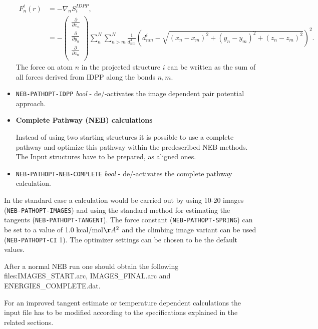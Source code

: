 \documentclass[10pt,a4paper]{article} %
\begin{document}
\begin{itemize}
	\begin{equation}
	\begin{aligned}
	F^{i}_{n}(r) &=-\nabla_{n}S^{IDPP}_{i}, \\
	&= -\left(\begin{matrix}
	\frac{\partial}{\partial x_{n}} \\
	\frac{\partial}{\partial y_{n}} \\
	\frac{\partial}{\partial z_{n}}  \\
	\end{matrix} \right) \sum^{N}_{n}\sum^{N}_{n>m} \frac{1}{d^{4}_{nm}} \left(d^{i}_{nm}-\sqrt{\left(x_{n}-x_{m}\right)^{2}+\left(y_{n}-y_{m}\right)^{2}+\left(z_{n}-z_{m}\right)^{2}}\right)^{2}.
	\end{aligned}											
	\end{equation}
	The force on atom $n$ in the projected structure $i$ can be written as the sum of all forces derived from IDPP along the bonds $n,m$. 
	
	\item \texttt{NEB-PATHOPT-IDPP} \textit{bool} -  de/-activates the image dependent pair potential approach.
	
	\item \textbf{Complete Pathway (NEB) calculations}
	
	Instead of using two starting structures it is possible to use a complete pathway and optimize this pathway within the predescribed NEB methods.
	The Input structures have to be prepared, as aligned ones.
	
	\item \texttt{NEB-PATHOPT-NEB-COMPLETE} \textit{bool} -  de/-activates the complete pathway calculation.
    \end{itemize}

In the standard case a calculation would be carried out by using 10-20 images (\texttt{NEB-PATHOPT-IMAGES}) and using the standard method for estimating the tangents (\texttt{NEB-PATHOPT-TANGENT}). The force constant (\texttt{NEB-PATHOPT-SPRING}) can be set to a value of 1.0 kcal/mol$\AA^{2}$  and the climbing image variant can be used (\texttt{NEB-PATHOPT-CI} 1). The optimizer settings can be chosen to be the default values.

After a normal NEB run one should obtain the following files:IMAGES\_START.arc, IMAGES\_FINAL.arc and ENERGIES\_COMPLETE.dat.

For an improved tangent estimate or temperature dependent calculations the input file has to be modified according to the specifications explained in the related sections. 
\end{document}
